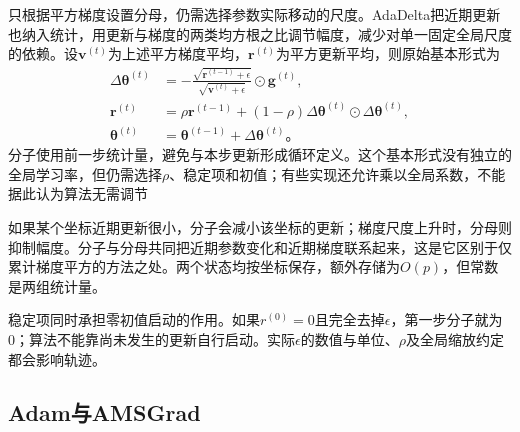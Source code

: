 只根据平方梯度设置分母，仍需选择参数实际移动的尺度。AdaDelta把近期更新也纳入统计，用更新与梯度的两类均方根之比调节幅度，减少对单一固定全局尺度的依赖。设$\bm v^{(t)}$为上述平方梯度平均，$\bm r^{(t)}$为平方更新平均，则原始基本形式为
\begin{align}
  \Delta\bm\theta^{(t)}&=-\frac{\sqrt{\bm r^{(t-1)}+\epsilon}}
                               {\sqrt{\bm v^{(t)}+\epsilon}}
                                \odot\bm g^{(t)},\\
  \bm r^{(t)}&=\rho\bm r^{(t-1)}+(1-\rho)
      \Delta\bm\theta^{(t)}\odot\Delta\bm\theta^{(t)},\\
  \bm\theta^{(t)}&=\bm\theta^{(t-1)}+\Delta\bm\theta^{(t)}\text{。}
  \label{eq:training-adadelta}
\end{align}
分子使用前一步统计量，避免与本步更新形成循环定义。这个基本形式没有独立的全局学习率，但仍需选择$\rho$、稳定项和初值；有些实现还允许乘以全局系数，不能据此认为算法无需调节

如果某个坐标近期更新很小，分子会减小该坐标的更新；梯度尺度上升时，分母则抑制幅度。分子与分母共同把近期参数变化和近期梯度联系起来，这是它区别于仅累计梯度平方的方法之处。两个状态均按坐标保存，额外存储为$O(p)$，但常数是两组统计量。

稳定项同时承担零初值启动的作用。如果$r^{(0)}=0$且完全去掉$\epsilon$，第一步分子就为0；算法不能靠尚未发生的更新自行启动。实际$\epsilon$的数值与单位、$\rho$及全局缩放约定都会影响轨迹。

\subsection{Adam与AMSGrad}
\label{sec:training-adam}

